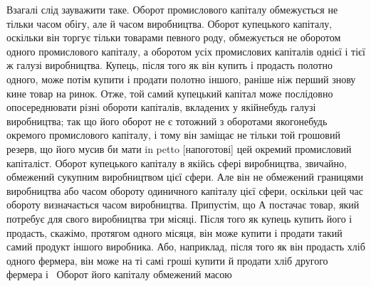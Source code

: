 Взагалі слід зауважити таке. Оборот промислового капіталу
обмежується не тільки часом обігу, але й часом виробництва.
Оборот купецького капіталу, оскільки він торгує тільки товарами
певного роду, обмежується не оборотом одного промислового
капіталу, а оборотом усіх промислових капіталів однієї
і тієї ж галузі виробництва. Купець, після того як він купить
і продасть полотно одного, може потім купити і продати полотно
іншого, раніше ніж перший знову кине товар на ринок.
Отже, той самий купецький капітал може послідовно опосереднювати
різні обороти капіталів, вкладених у якійнебудь галузі
виробництва; так що його оборот не є тотожний з оборотами
якогонебудь окремого промислового капіталу, і тому він заміщає
не тільки той грошовий резерв, що його мусив би мати in
petto [напоготові] цей окремий промисловий капіталіст. Оборот
купецького капіталу в якійсь сфері виробництва, звичайно, обмежений
сукупним виробництвом цієї сфери. Але він не обмежений
границями виробництва або часом обороту одиничного
капіталу цієї сфери, оскільки цей час обороту визначається часом
виробництва. Припустім, що А постачає товар, який потребує
для свого виробництва три місяці. Після того як купець
купить його і продасть, скажімо, протягом одного місяця, він
може купити і продати такий самий продукт іншого виробника.
Або, наприклад, після того як він продасть хліб одного фермера,
він може на ті самі гроші купити й продати хліб другого
фермера і~ Оборот його капіталу обмежений масою
\parbreak{}  %
